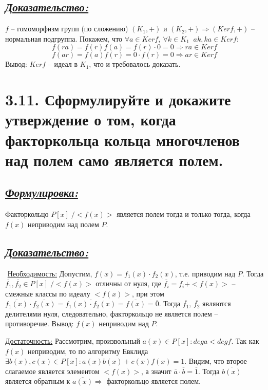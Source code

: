 \documentclass{article}
\begin{document}
\subsection*{\Large \underline{\textit{Доказательство: }}}
$f$ -- гомоморфизм групп (по сложению) $(K_1, +)$ и $(K_2, +) \Rightarrow (Kerf, +)$ -- нормальная подгруппа. Покажем, что $\forall a \in Kerf,\: \forall k \in K_1 \;\; ak, ka \in Kerf$:
$$f(ra) = f(r)f(a) = f(r)\cdot 0 = 0 \Rightarrow ra \in Kerf$$
$$f(ar) = f(a)f(r) = 0\cdot f(r) = 0 \Rightarrow ar \in Kerf$$
Вывод: $Kerf$ -- идеал в $K_1$, что и требовалось доказать.

\section*{\LARGE 3.11. Сформулируйте и докажите утверждение о том, когда факторкольца кольца многочленов над полем само является полем. }
\subsection*{\Large \underline{\textit{Формулировка: }}}
Факторкольцо $P[x] \;/ <f(x)>$ является полем тогда и только тогда, когда $f(x)$ неприводим над полем $P$.

\subsection*{\Large \underline{\textit{Доказательство: }}}
$ $ \indent \underline{Необходимость:}
\newline Допустим, $f(x) = f_1(x) \cdot f_2(x)$, т.е. приводим над $P$. Тогда 
\newline $\overline{f_1}, \overline{f_2} \in P[x] \;/ <f(x)>$ отличны от нуля, где $\overline{f_i} = f_i + <f(x)>$ -- смежные классы по идеалу $<f(x)>$, при этом $\overline{f_1(x)}\cdot \overline{f_2(x)} = \overline{f_1(x) \cdot f_2(x)} = \overline{f(x)} = \overline{0}$. Тогда $\overline{f_1},\, \overline{f_2}$ являются делителями нуля, следовательно, факторкольцо не является полем -- противоречие. Вывод: $f(x)$ неприводим над $P$.

\underline{Достаточность:}
\newline Рассмотрим, произвольный $a(x) \in P[x] : dega < degf$. Так как $f(x)$ неприводим, то по алгоритму Евклида $\exists b(x), c(x) \in P[x] : a(x) b(x) + c(x) f(x) = 1$. Видим, что второе слагаемое является элементом $<f(x)>$, а значит $\overline{a}\cdot \overline{b} = \overline{1}$. Тогда $\overline{b(x)}$ является обратным к $\overline{a(x)} \Rightarrow$ факторкольцо является полем. 
\end{document}
